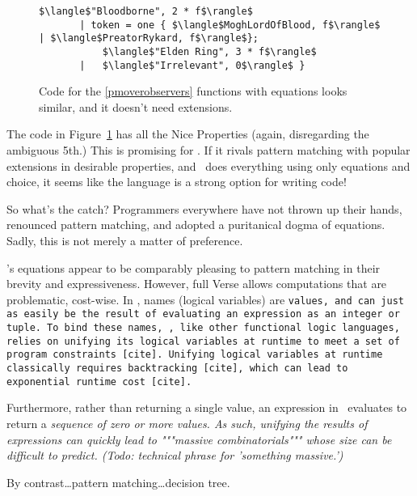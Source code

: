 \documentclass[manuscript,screen,review, 12pt, nonacm]{acmart}
\begin{document}
\begin{outline}[enumerate]
\begin{figure}[ht]
\begin{minipage}[h]{\linewidth}
\begin{lstlisting}[numbers=none, basicstyle=\tiny, xleftmargin=9em, 
                            frame=single]
           $\langle$"Bloodborne", 2 * f$\rangle$
       | token = one { $\langle$MoghLordOfBlood, f$\rangle$ | $\langle$PreatorRykard, f$\rangle$}; 
           $\langle$"Elden Ring", 3 * f$\rangle$
       |   $\langle$"Irrelevant", 0$\rangle$ }
          \end{lstlisting}
            \label{fig:versegot} 
        \vspace{4ex}
        \end{minipage}%
    \caption{Code for the \ref{pmoverobservers} functions with equations looks
    similar, and it doesn't need extensions.}
    \label{fig:verseextfuncs}
      \end{figure}
        
    The code in Figure~\ref{fig:verseextfuncs} has all the Nice Properties
    (again, disregarding the ambiguous 5th.) This is promising for \VC. If it
    rivals pattern matching with popular extensions in desirable properties, and
    \VC\ does everything using only equations and choice, it seems like the
    language is a strong option for writing code! 

    So what's the catch? Programmers everywhere have not thrown up their hands,
    renounced pattern matching, and adopted a puritanical dogma of equations. 
    Sadly, this is not merely a matter of preference. 

    \VC's equations appear to be comparably pleasing to pattern matching in
    their brevity and expressiveness. However, full Verse allows computations
    that are problematic, cost-wise. In \VC, names (logical variables) are
    \tt{values}, and can just as easily be the result of evaluating an
    expression as an integer or tuple. To bind these names, \VC, like other
    functional logic languages, relies on unifying its logical variables at
    runtime to meet a set of program constraints [cite]. Unifying logical
    variables at runtime classically requires backtracking [cite], which can
    lead to exponential runtime cost [cite]. 
        
    Furthermore, rather than returning a single value, an expression in \VC\
    evaluates to return a \it{sequence} of zero or more values. As such,
    unifying the results of expressions can quickly lead to """massive
    combinatorials""" whose size can be difficult to predict. (Todo: technical phrase for 'something massive.') 


    By contrast\dots pattern matching\dots decision tree. 


\end{outline}
\end{document}
